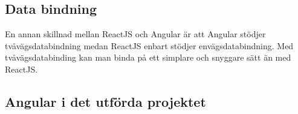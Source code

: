 \subsection{Data bindning}
En annan skillnad mellan ReactJS och Angular är att Angular stödjer tvåvägsdatabindning medan ReactJS enbart stödjer envägsdatabindning. Med tvåvägsdatabinding kan man binda på ett simplare och snyggare sätt än med ReactJS.

\subsection{Angular i det utförda projektet}

\pagebreak
 
